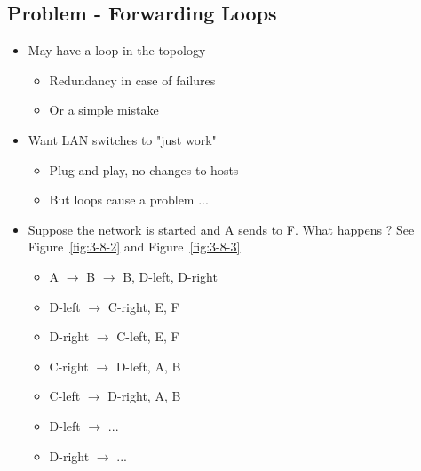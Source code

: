 \documentclass[12pt]{ctexart}   %
\begin{document}
	\subsection{ Problem - Forwarding Loops}
	\begin{itemize}
		\item May have a loop in the topology
		\begin{itemize}
			\item Redundancy in case of failures
			\item Or a simple mistake
		\end{itemize}
		
		\item Want LAN switches to "just work"
		\begin{itemize}
			\item Plug-and-play, no changes to hosts
			\item But loops cause a problem ...
		\end{itemize}
		
		\item Suppose the network is started and A sends to F. What happens ?  See Figure~\ref{fig:3-8-2} and Figure~\ref{fig:3-8-3}
		\begin{itemize}
			\item A $\rightarrow$ B $\rightarrow$ B, D-left, D-right
			\item D-left $\rightarrow$ C-right, E, F
			\item D-right $\rightarrow$ C-left, E, F
			\item C-right $\rightarrow$ D-left, A, B
			\item C-left $\rightarrow$ D-right, A, B
			\item D-left $\rightarrow$ ...
			\item D-right $\rightarrow$ ...
		\end{itemize}
		

\end{itemize}
\end{document}
